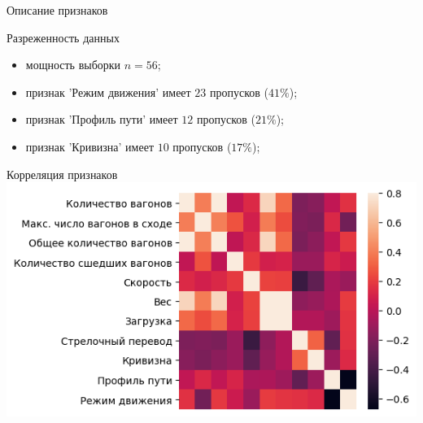 \documentclass[aspectratio=169]{beamer}
\begin{document}
    \begin{frame}{Описание признаков}
        \begin{block}{Разреженность данных}
            \begin{itemize}
                \item мощность выборки $n = 56$;
                \item признак 'Режим движения' имеет $23$ пропусков ($41\%$);
                \item признак 'Профиль пути' имеет $12$ пропусков ($21\%$);
                \item признак 'Кривизна' имеет $10$ пропусков ($17\%$);
            \end{itemize}
        \end{block}
    \end{frame}


    \begin{frame}{Корреляция признаков}
        \centering
        \includegraphics[width=1.3\textheight]{src/corr_plot.png}
    \end{frame}
\end{document}
